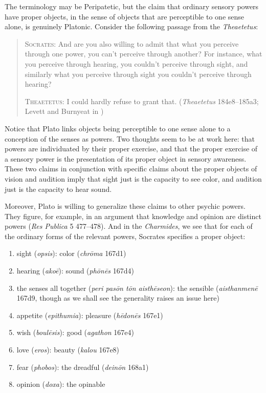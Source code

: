 The terminology may be Peripatetic, but the claim that ordinary sensory powers have proper objects, in the sense of objects that are perceptible to one sense alone, is genuinely Platonic. Consider the following passage from the \emph{Theaetetus}:
\begin{quotation}
	\textsc{Socrates}: And are you also willing to admit that what you perceive through one power, you can't perceive through another? For instance, what you perceive through hearing, you couldn't perceive through sight, and similarly what you perceive through sight you couldn't perceive through hearing?
	
	\textsc{Theaetetus}: I could hardly refuse to grant that. (\emph{Theaetetus} 184e8–185a3; Levett and Burnyeat in \citealt[204]{Cooper:1997fk})
\end{quotation}
Notice that Plato links objects being perceptible to one sense alone to a conception of the senses as powers. Two thoughts seem to be at work here: that powers are individuated by their proper exercise, and that the proper exercise of a sensory power is the presentation of its proper object in sensory awareness. These two claims in conjunction with specific claims about the proper objects of vision and audition imply that sight just is the capacity to see color, and audition just is the capacity to hear sound. 

Moreover, Plato is willing to generalize these claims to other psychic powers. They figure, for example, in an argument that knowledge and opinion are distinct powers (\emph{Res Publica} 5 477--478). And in the \emph{Charmides}, we see that for each of the ordinary forms of the relevant powers, Socrates specifies a proper object:
\begin{enumerate}[(1)]
	\item sight (\emph{opsis}): color (\emph{chrōma} 167d1)
	\item hearing (\emph{akoē}): sound (\emph{phōnēs} 167d4)
	\item the senses all together (\emph{peri pasōn tōn aisthēseon}): the sensible (\emph{aisthanmenē} 167d9, though as we shall see the generality raises an issue here)
	\item appetite (\emph{epithumia}): pleasure (\emph{hēdonēs} 167e1)
	\item wish (\emph{boulēsis}): good (\emph{agathon} 167e4)
	\item love (\emph{eros}): beauty (\emph{kalou} 167e8)
	\item fear (\emph{phobos}): the dreadful (\emph{deinōn} 168a1)
	\item opinion (\emph{doxa}): the opinable
\end{enumerate}

